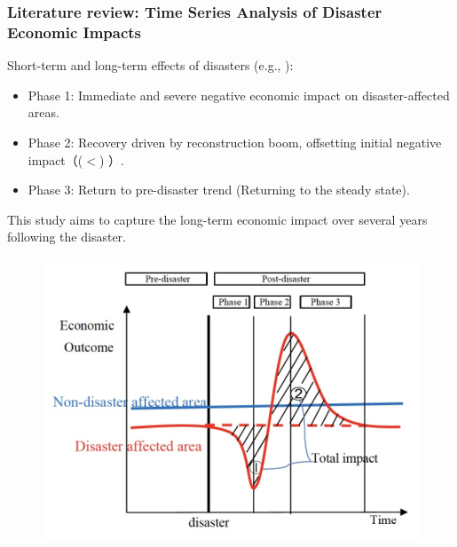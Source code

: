 \documentclass[serif, aspectratio=169]{beamer}
\newcommand{\longtermimpactlinks}{%
    \vfill %
    \hfill %
    {\small %
        \hyperlink{real_GDP_growth_rate}{\beamerbutton{→ GRP}} \,

    }
}
\begin{document}
\begin{frame}[label=literature_review1]
\frametitle{Literature review: Time Series Analysis of Disaster Economic Impacts}

    \begin{minipage}[c]{0.4\linewidth}
        \small

        \vspace{-2.3cm}
        
Short-term and long-term effects of disasters (e.g., \citet{Deryugina2018TheReturns} ): 
\begin{itemize}
    \item Phase 1: Immediate and severe negative economic impact on disaster-affected areas.
    \item Phase 2: Recovery driven by reconstruction boom, offsetting initial negative impact（($<$) ）.
    \item Phase 3: Return to pre-disaster trend (Returning to the steady state).
\end{itemize}


This study aims to capture the long-term economic impact over several years following the disaster.

        
        \vspace{-2.1cm}
        

    \end{minipage}\hspace{0.5cm}
    \begin{minipage}{0.3\linewidth}
        \medskip
        \begin{figure}[h]
            \centering
            \includegraphics[height=.8\textheight]{conceptual_image.jpeg}
        \end{figure}
    \end{minipage}

\longtermimpactlinks

\end{frame}
\end{document}
